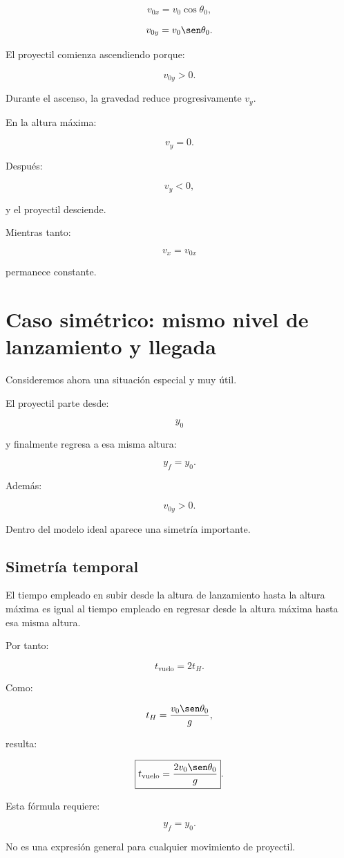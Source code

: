 \[
v_{0x}=v_0\cos\theta_0,
\]

\[
v_{0y}=v_0\sen\theta_0.
\]

El proyectil comienza ascendiendo porque:

\[
v_{0y}>0.
\]

Durante el ascenso, la gravedad reduce progresivamente \(v_y\).

En la altura máxima:

\[
v_y=0.
\]

Después:

\[
v_y<0,
\]

y el proyectil desciende.

Mientras tanto:

\[
v_x=v_{0x}
\]

permanece constante.


\section{Caso simétrico: mismo nivel de lanzamiento y llegada}

Consideremos ahora una situación especial y muy útil.

El proyectil parte desde:

\[
y_0
\]

y finalmente regresa a esa misma altura:

\[
y_f=y_0.
\]

Además:

\[
v_{0y}>0.
\]

Dentro del modelo ideal aparece una simetría importante.


\subsection{Simetría temporal}

El tiempo empleado en subir desde la altura de lanzamiento hasta la altura
máxima es igual al tiempo empleado en regresar desde la altura máxima hasta esa
misma altura.

Por tanto:

\[
t_{\mathrm{vuelo}}
=
2t_H.
\]

Como:

\[
t_H
=
\frac{v_0\sen\theta_0}{g},
\]

resulta:

\[
\boxed{
t_{\mathrm{vuelo}}
=
\frac{
2v_0\sen\theta_0
}{
g
}
}.
\]

\begin{condicion}
Esta fórmula requiere:

\[
y_f=y_0.
\]

No es una expresión general para cualquier movimiento de proyectil.
\end{condicion}


